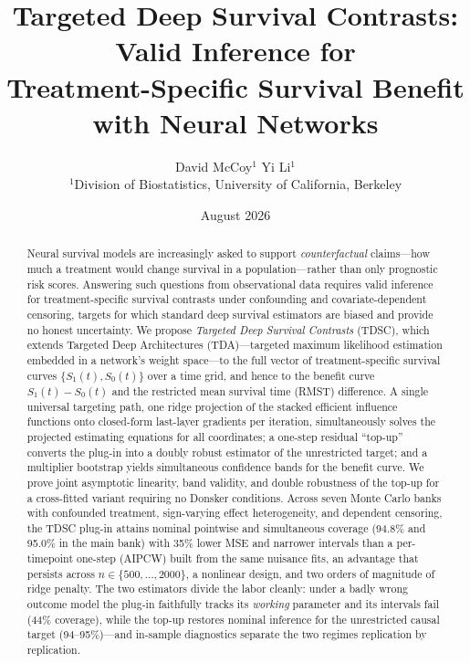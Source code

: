 \documentclass[11pt]{article}
\title{Targeted Deep Survival Contrasts: Valid Inference for\\ Treatment-Specific Survival Benefit with Neural Networks}
\author{David McCoy$^{1}$ \quad Yi Li$^{1}$\\[4pt]
\small $^1$Division of Biostatistics, University of California, Berkeley}
\date{\small August 2026}
\theoremstyle{remark}
\begin{document}
\maketitle

\begin{abstract}
Neural survival models are increasingly asked to support \emph{counterfactual} claims---how much a treatment would change survival in a population---rather than only prognostic risk scores. Answering such questions from observational data requires valid inference for treatment-specific survival contrasts under confounding and covariate-dependent censoring, targets for which standard deep survival estimators are biased and provide no honest uncertainty. We propose \emph{Targeted Deep Survival Contrasts} (TDSC), which extends Targeted Deep Architectures (TDA)---targeted maximum likelihood estimation embedded in a network's weight space---to the full vector of treatment-specific survival curves $\{S_1(t), S_0(t)\}$ over a time grid, and hence to the benefit curve $S_1(t)-S_0(t)$ and the restricted mean survival time (RMST) difference. A single universal targeting path, one ridge projection of the stacked efficient influence functions onto closed-form last-layer gradients per iteration, simultaneously solves the projected estimating equations for all coordinates; a one-step residual ``top-up'' converts the plug-in into a doubly robust estimator of the unrestricted target; and a multiplier bootstrap yields simultaneous confidence bands for the benefit curve. We prove joint asymptotic linearity, band validity, and double robustness of the top-up for a cross-fitted variant requiring no Donsker conditions. Across seven Monte Carlo banks with confounded treatment, sign-varying effect heterogeneity, and dependent censoring, the TDSC plug-in attains nominal pointwise and simultaneous coverage (94.8\% and 95.0\% in the main bank) with 35\% lower MSE and narrower intervals than a per-timepoint one-step (AIPCW) built from the same nuisance fits, an advantage that persists across $n\in\{500,\dots,2000\}$, a nonlinear design, and two orders of magnitude of ridge penalty. The two estimators divide the labor cleanly: under a badly wrong outcome model the plug-in faithfully tracks its \emph{working} parameter and its intervals fail (44\% coverage), while the top-up restores nominal inference for the unrestricted causal target (94--95\%)---and in-sample diagnostics separate the two regimes replication by replication.
\end{abstract}
\end{document}
